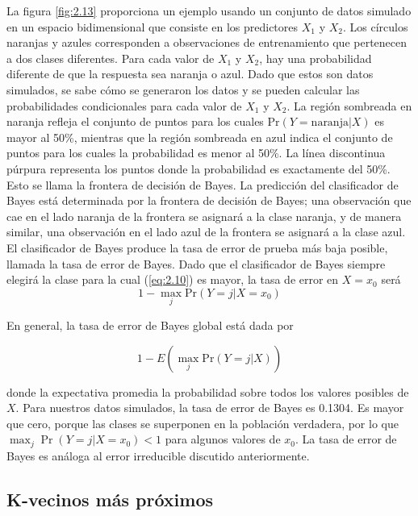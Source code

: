 La figura \ref{fig:2.13} proporciona un ejemplo usando un conjunto de datos simulado en un espacio bidimensional que consiste en los predictores $X_1$ y $X_2$. Los círculos naranjas y azules corresponden a observaciones de entrenamiento que pertenecen a dos clases diferentes. Para cada valor de $X_1$ y $X_2$, hay una probabilidad diferente de que la respuesta sea naranja o azul. Dado que estos son datos simulados, se sabe cómo se generaron los datos y se pueden calcular las probabilidades condicionales para cada valor de $X_1$ y $X_2$. La región sombreada en naranja refleja el conjunto de puntos para los cuales $\text{Pr}(Y = \text{naranja} | X)$ es mayor al 50\%, mientras que la región sombreada en azul indica el conjunto de puntos para los cuales la probabilidad es menor al 50\%. La línea discontinua púrpura representa los puntos donde la probabilidad es exactamente del 50\%. Esto se llama la frontera de decisión de Bayes. La predicción del clasificador de Bayes está determinada por la frontera de decisión de Bayes; una observación que cae en el lado naranja de la frontera se asignará a la clase naranja, y de manera similar, una observación en el lado azul de la frontera se asignará a la clase azul. \\

El clasificador de Bayes produce la tasa de error de prueba más baja posible, llamada la tasa de error de Bayes. Dado que el clasificador de Bayes siempre elegirá la clase para la cual (\ref{eq:2.10}) es mayor, la tasa de error en $X = x_0$ será 
\begin{equation}
1 - \max_j \text{Pr}(Y = j | X = x_0)
\end{equation}

\noindent En general, la tasa de error de Bayes global está dada por

\begin{equation}
1 - E\left(\max_j \text{Pr}(Y = j | X)\right)
\end{equation}

donde la expectativa promedia la probabilidad sobre todos los valores posibles de $X$. Para nuestros datos simulados, la tasa de error de Bayes es 0.1304. Es mayor que cero, porque las clases se superponen en la población verdadera, por lo que $\max_j \Pr(Y = j | X = x_0) < 1$ para algunos valores de $x_0$. La tasa de error de Bayes es análoga al error irreducible discutido anteriormente.

\subsection{K-vecinos más próximos}

